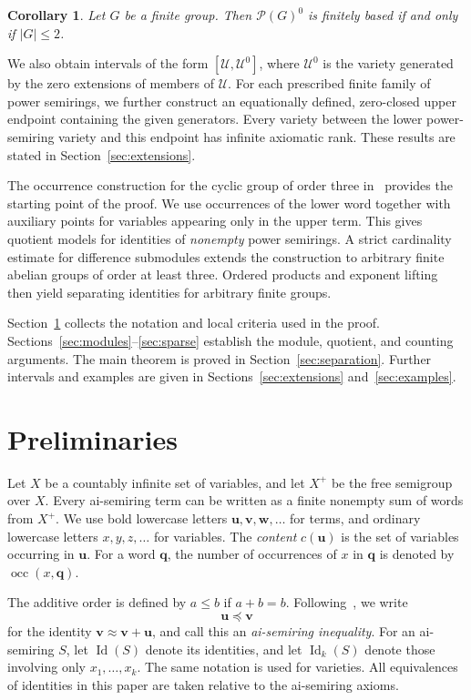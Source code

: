 \documentclass[11pt,reqno]{amsart}
\newtheorem{corollary}[theorem]{Corollary}
\theoremstyle{definition}
\numberwithin{equation}{section}
\newcommand{\Full}[1]{\mathcal{P}(#1)^0}
\newcommand{\Id}{\operatorname{Id}}
\newcommand{\occ}{\operatorname{occ}}
\newcommand{\bu}{\mathbf{u}}
\newcommand{\bv}{\mathbf{v}}
\newcommand{\bw}{\mathbf{w}}
\newcommand{\bq}{\mathbf{q}}
\newcommand{\calU}{\mathcal{U}}
\renewcommand{\leq}{\leqslant}
\begin{document}
\begin{corollary}\label{thm:classification}
Let $G$ be a finite group. Then $\Full{G}$ is finitely based if and only if $|G|\leq 2$.
\end{corollary}

We also obtain intervals of the form $[\calU,\calU^0]$, where $\calU^0$ is the variety generated by the zero extensions of members of $\calU$. For each prescribed finite family of power semirings, we further construct an equationally defined, zero-closed upper endpoint containing the given generators. Every variety between the lower power-semiring variety and this endpoint has infinite axiomatic rank. These results are stated in Section~\ref{sec:extensions}.

The occurrence construction for the cyclic group of order three in~\cite{note} provides the starting point of the proof. We use occurrences of the lower word together with auxiliary points for variables appearing only in the upper term. This gives quotient models for identities of \emph{nonempty} power semirings. A strict cardinality estimate for difference submodules extends the construction to arbitrary finite abelian groups of order at least three. Ordered products and exponent lifting then yield separating identities for arbitrary finite groups.

Section~\ref{sec:prelim} collects the notation and local criteria used in the proof. Sections~\ref{sec:modules}--\ref{sec:sparse} establish the module, quotient, and counting arguments. The main theorem is proved in Section~\ref{sec:separation}. Further intervals and examples are given in Sections~\ref{sec:extensions} and~\ref{sec:examples}.

\section{Preliminaries}\label{sec:prelim}
Let $X$ be a countably infinite set of variables, and let $X^+$ be the free semigroup over $X$. Every ai-semiring term can be written as a finite nonempty sum of words from $X^+$. We use bold lowercase letters $\bu,\bv,\bw,\ldots$ for terms, and ordinary lowercase letters $x,y,z,\ldots$ for variables. The \emph{content} $c(\bu)$ is the set of variables occurring in $\bu$. For a word $\bq$, the number of occurrences of $x$ in $\bq$ is denoted by $\occ(x,\bq)$.

The additive order is defined by $a\leq b$ if $a+b=b$. Following~\cite{grsy}, we write
\[
 \bu\preceq\bv
\]
for the identity $\bv\approx\bv+\bu$, and call this an \emph{ai-semiring inequality}. For an ai-semiring $S$, let $\Id(S)$ denote its identities, and let $\Id_k(S)$ denote those involving only $x_1,\ldots,x_k$. The same notation is used for varieties. All equivalences of identities in this paper are taken relative to the ai-semiring axioms.
\end{document}
